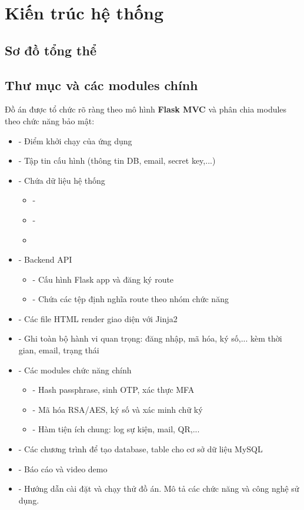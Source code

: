 \newpage
\section{Kiến trúc hệ thống}
\subsection{Sơ đồ tổng thể}

\subsection{Thư mục và các modules chính}
Đồ án được tổ chức rõ ràng theo mô hình \textbf{Flask MVC} và phân chia modules theo chức năng bảo mật:
\begin{itemize}
    \item {} - Điểm khởi chạy của ứng dụng 
    \item {} - Tập tin cấu hình (thông tin DB, email, secret key,...)
    \item {} - Chứa dữ liệu hệ thống
    \begin{itemize}
        \item {} - 
        \item {} - 
        \item {}
    \end{itemize}
    \item {} - Backend API
    \begin{itemize}
        \item {} - Cấu hình Flask app và đăng ký route
        \item {} - Chứa các tệp định nghĩa route theo nhóm chức năng
    \end{itemize}
    \item {} - Các file HTML render giao diện với Jinja2
    \item {} - Ghi toàn bộ hành vi quan trọng: đăng nhập, mã hóa, ký số,... kèm thời gian, email, trạng thái
    \item {} - Các modules chức năng chính
    \begin{itemize}
        \item {} - Hash passphrase, sinh OTP, xác thực MFA
        \item {} - Mã hóa RSA/AES, ký số và xác minh chữ ký
        \item {} - Hàm tiện ích chung: log sự kiện, mail, QR,...
    \end{itemize}
    \item {} - Các chương trình để tạo database, table cho cơ sở dữ liệu MySQL
    \item {} - Báo cáo và video demo
    \item {} - Hướng dẫn cài đặt và chạy thử đồ án. Mô tả các chức năng và công nghệ sử dụng.
\end{itemize}